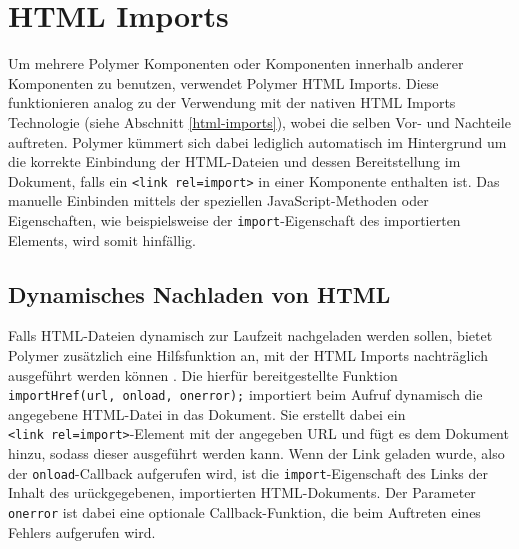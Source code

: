 \section{HTML Imports}\label{polymer-html-imports}

Um mehrere Polymer Komponenten oder Komponenten innerhalb anderer Komponenten zu benutzen, verwendet Polymer \ac{HTML} Imports. Diese funktionieren analog zu der Verwendung mit der nativen \ac{HTML} Imports Technologie (siehe Abschnitt \ref{html-imports}), wobei die selben Vor- und Nachteile auftreten. Polymer kümmert sich dabei lediglich automatisch im Hintergrund um die korrekte Einbindung der \ac{HTML}-Dateien und dessen Bereitstellung im Dokument, falls ein \texttt{\textless{}link\ rel=\dq import\dq\textgreater{}} in einer Komponente enthalten ist. Das manuelle Einbinden mittels der speziellen JavaScript-Methoden oder Eigenschaften, wie beispielsweise der \texttt{import}-Eigenschaft des importierten Elements, wird somit hinfällig.

\subsection{Dynamisches Nachladen von HTML}\label{dynamisches-nachladen-von-html}

Falls \ac{HTML}-Dateien dynamisch zur Laufzeit nachgeladen werden sollen, bietet Polymer zusätzlich eine Hilfsfunktion an, mit der \ac{HTML} Imports nachträglich ausgeführt werden können \cite{citeulike:13914840}. Die hierfür bereitgestellte Funktion \texttt{importHref(url,\ onload,\ onerror);} importiert beim Aufruf dynamisch die angegebene \ac{HTML}-Datei in das Dokument. Sie erstellt dabei ein \texttt{\textless{}link\ rel=\dq import\dq\textgreater{}}-Element mit der angegeben URL und fügt es dem Dokument hinzu, sodass dieser ausgeführt werden kann. Wenn der Link geladen wurde, also der \texttt{onload}-Callback aufgerufen wird, ist die \texttt{import}-Eigenschaft des Links der Inhalt des  urückgegebenen, importierten \ac{HTML}-Dokuments. Der Parameter \texttt{onerror} ist dabei eine optionale Callback-Funktion, die beim Auftreten eines Fehlers aufgerufen wird.
